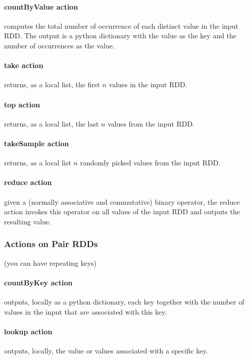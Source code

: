 \paragraph{countByValue action} computes the total number of occurrence of each distinct value in the input RDD. The output is a python dictionary with the value as the key and the number of occurrences as the value.

\paragraph{take action} returns, as a local list, the first $n$ values in the input RDD.

\paragraph{top action} returns, as a local list, the last $n$ values from the input RDD.

\paragraph{takeSample action} returns, as a local list $n$ randomly picked values from the input RDD.

\paragraph{reduce action} given a (normally associative and commutative) binary operator, the reduce action invokes this operator on all values of the input RDD and outputs the resulting value.


\subsubsection{Actions on Pair RDDs}

(you can have repeating keys)

\paragraph{countByKey action} outputs, locally as a python dictionary, each key together with the number of values in the input that are associated with this key.

\paragraph{lookup action} outputs, locally, the value or values associated with a specific key.


